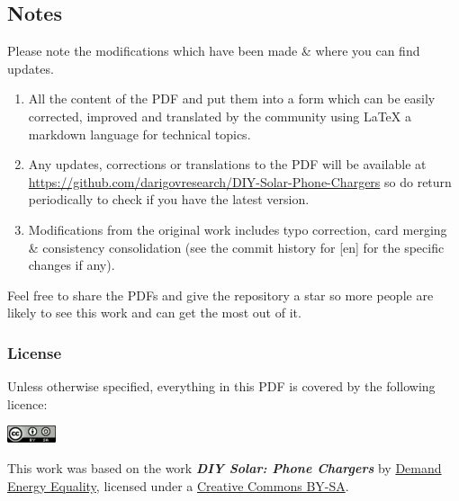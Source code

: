 \documentclass{article}
\theoremstyle{definition}
\theoremstyle{definition}
\theoremstyle{remark}
\begin{document}

  \subsection*{Notes} %
  \label{sub:notes}

    Please note the modifications which have been made \& where you can find updates.

    \begin{enumerate}
      \item All the content of the PDF and put them into a form which can be easily corrected, improved and translated by the community using LaTeX a markdown language for technical topics.
      \item Any updates, corrections or translations to the PDF will be available at \href{https://github.com/darigovresearch/DIY-Solar-Phone-Chargers}{https://github.com/darigovresearch/DIY-Solar-Phone-Chargers} so do return periodically to check if you have the latest version.
      \item Modifications from the original work includes typo correction, card merging \& consistency consolidation (see the commit history for [en] for the specific changes if any).
    \end{enumerate}

    Feel free to share the PDFs and give the repository a star so more people are likely to see this work and can get the most out of it.


  \subsubsection*{License} %
  \label{ssub:license}

    Unless otherwise specified, everything in this PDF is covered by the following licence:

    \includegraphics[]{../Images/image_0_2_(license).png} \newline

    This work was based on the work \textbf{\textit{DIY Solar: Phone Chargers}} by \href{https://www.demandenergyequality.org/}{Demand Energy Equality}, licensed under a \href{https://creativecommons.org/licenses/by-sa/4.0/legalcode}{Creative Commons BY-SA}.
\end{document}
